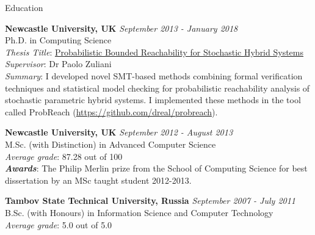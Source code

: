 \documentclass{resume} %
\begin{document}
\begin{rSection}{Education}


{\bf Newcastle University, UK} \hfill {\em September 2013 - January 2018} \\ 
Ph.D. in Computing Science  \\
{\em Thesis Title}: \href{http://hdl.handle.net/10443/4046}{Probabilistic Bounded Reachability for Stochastic Hybrid Systems} \\ 
{\em Supervisor}: Dr Paolo Zuliani \\
{\em Summary}: I developed novel SMT-based methods combining formal verification techniques
and statistical model checking for probabilistic reachability analysis
of stochastic parametric hybrid systems. 
I implemented these methods in the tool 
called ProbReach (\url{https://github.com/dreal/probreach}).

\smallskip 

{\bf Newcastle University, UK} \hfill {\em September 2012 - August 2013} \\ 
M.Sc. (with Distinction) in Advanced Computer Science \\
{\em Average grade}: 87.28 out of 100 \\
{\bf {\em Awards}}: The Philip Merlin prize from the School of Computing Science 
for best dissertation by an MSc taught student 2012-2013.
\smallskip 

{\bf Tambov State Technical University, Russia} \hfill {\em September 2007 - July 2011} \\ 
B.Sc. (with Honours) in Information Science and Computer Technology \\
{\em Average grade}: 5.0 out of 5.0

\end{rSection}








\end{document}

